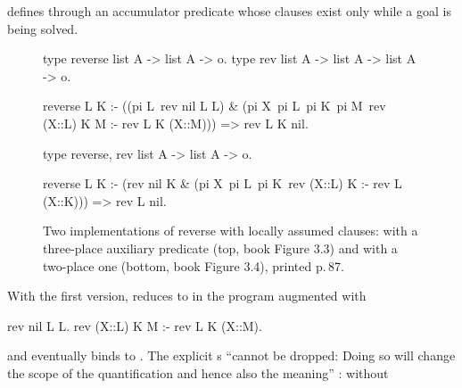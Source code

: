 { defines  through an accumulator predicate  whose clauses exist only
while a  goal is being solved.

\begin{figure}[b]
\begin{lprolog}
type reverse    list A -> list A -> o.
type rev        list A -> list A -> list A -> o.

reverse L K :-
   ((pi L\ rev nil L L) &
    (pi X\ pi L\ pi K\ pi M\ rev (X::L) K M :- rev L K (X::M)))
        => rev L K nil.
\end{lprolog}
\begin{lprolog}
type reverse, rev    list A -> list A -> o.

reverse L K :-
   (rev nil K &
    (pi X\ pi L\ pi K\ rev (X::L) K :- rev L (X::K)))
        => rev L nil.
\end{lprolog}
\caption{Two implementations of reverse with locally assumed clauses: with a three-place auxiliary
predicate (top, book Figure 3.3) and with a two-place one (bottom, book Figure 3.4), printed p.\,87.}
\label{fig:hh-rev4}
\end{figure}

With the first version,  reduces to  in the
program augmented with
\begin{lprolog}
rev nil L L.
rev (X::L) K M :- rev L K (X::M).
\end{lprolog}
and eventually binds  to  . The explicit s ``cannot be
dropped: Doing so will change the scope of the quantification and hence also the meaning'' :
without }
